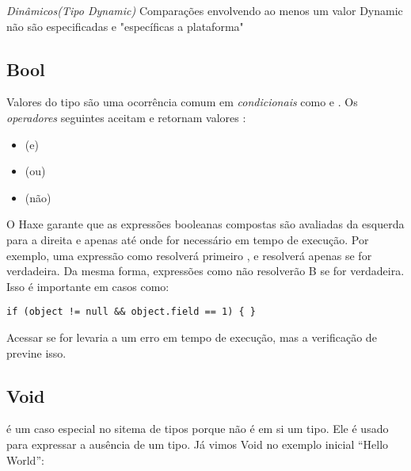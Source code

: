 \emph{Dinâmicos(Tipo Dynamic)}
Comparações envolvendo ao menos um valor Dynamic não são especificadas e "específicas a plataforma"

\subsection{Bool}
\label{types-bool}


Valores do tipo  são uma ocorrência comum em \emph{condicionais} como  e . Os \emph{operadores} seguintes aceitam e retornam valores :

\begin{itemize}
    \item \expr{\&\&} (e)
	\item \expr{||} (ou)
	\item \expr{!} (não)
\end{itemize}

O Haxe garante que as expressões booleanas compostas são avaliadas da esquerda para a direita e apenas até onde for necessário em tempo de execução. Por exemplo, uma expressão como resolverá primeiro , e resolverá  apenas se  for verdadeira. Da mesma forma, expressões como  não resolverão B se  for verdadeira. Isso é importante em casos como:

\begin{lstlisting}
if (object != null && object.field == 1) { }
\end{lstlisting}

Acessar  se  for  levaria a um erro em tempo de execução, mas a verificação de  previne isso.




\subsection{Void}
\label{types-void}


 é um caso especial no sitema de tipos porque não é em si um tipo. Ele é usado para expressar a ausência de um tipo. Já vimos Void no exemplo inicial ``Hello World'':

